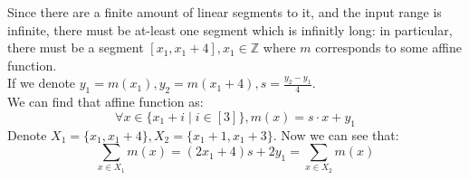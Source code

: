 Since there are a finite amount of linear segments to it,
and the input range is infinite, there must be at-least
one segment which is infinitly long: in particular,
there must be a segment $[x_1,x_1+4], x_1\in\mathbb{Z}$
where $m$ corresponds to some affine function.\\
If we denote $y_1=m(x_1), y_2=m(x_1+4), s = \frac{y_2-y_1}{4}$.\\
We can find that affine function as:
\[
    \forall x\in \{x_1+i\mid i\in[3]\}, m(x)=s\cdot x+y_1
\]
Denote $X_1=\{x_1,x_1+4\}, X_2=\{x_1+1,x_1+3\}$.
Now we can see that:
\[
    \sum_{x\in X_1}m(x)=
    (2x_1+4)s+2y_1=
    \sum_{x\in X_2}m(x)
\]
